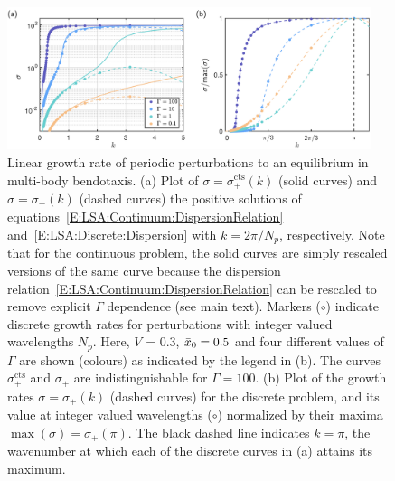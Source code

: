 \begin{figure}[t]
\centering
\includegraphics[width = 0.95\textwidth]{growth_rate.pdf}
\caption{Linear growth rate of periodic perturbations to an equilibrium in multi-body bendotaxis. (a) Plot of $\sigma= \sigma_{+}^{\text{cts}}(k)$ (solid curves) and $\sigma = \sigma_{+}(k)$ (dashed curves) the positive solutions of equations~\eqref{E:LSA:Continuum:DispersionRelation} and~\eqref{E:LSA:Discrete:Dispersion} with $k = 2\pi/N_p$, respectively. Note that for the continuous problem, the solid curves are simply rescaled versions of the same curve because the dispersion relation~\eqref{E:LSA:Continuum:DispersionRelation} can be rescaled to remove explicit $\Gamma$ dependence (see main text).  Markers ($\circ$) indicate discrete growth rates for perturbations with integer valued wavelengths $N_p$. Here, $V$ = 0.3, $\bar{x}_0 = 0.5$ and four different values of $\Gamma$ are shown (colours) as indicated by the legend in (b). The curves $\sigma_+^{\text{cts}}$ and $\sigma_+$ are indistinguishable for $\Gamma = 100$. (b) Plot of the growth rates $\sigma = \sigma_{+}(k)$ (dashed curves) for the discrete problem, and its value at integer valued wavelengths ($\circ$) normalized by their maxima $\max(\sigma)=\sigma_{+}(\pi)$.  The black dashed line indicates $k = \pi$, the wavenumber at which each of the discrete curves in (a) attains its maximum.}\label{fig:LSA:GrowthRateComparison}
\end{figure}

